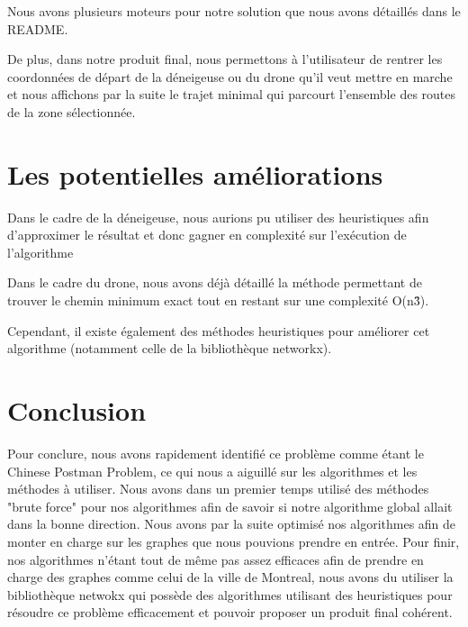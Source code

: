 \documentclass{article}
\begin{document}
\newline

Nous avons plusieurs moteurs pour notre solution que nous avons détaillés dans le README.

\newline

De plus, dans notre produit final, nous permettons à l'utilisateur de rentrer les coordonnées de départ de la déneigeuse ou du drone qu'il veut mettre en marche et nous affichons par la suite le trajet minimal qui parcourt l'ensemble des routes de la zone sélectionnée. 



\vspace{1cm}

\section{Les potentielles améliorations}

Dans le cadre de la déneigeuse, nous aurions pu utiliser des heuristiques afin d'approximer le résultat et donc gagner en complexité sur l'exécution de l'algorithme

Dans le cadre du drone, nous avons déjà détaillé la méthode permettant de trouver le chemin minimum exact tout en restant sur une complexité O(n\^3).

\newline

Cependant, il existe également des méthodes heuristiques pour améliorer cet algorithme (notamment celle de la bibliothèque networkx).



\newpage

\section{Conclusion}

Pour conclure, nous avons rapidement identifié ce problème comme étant le Chinese Postman Problem, ce qui nous a aiguillé sur les algorithmes et les méthodes à utiliser. Nous avons dans un premier temps utilisé des méthodes "brute force" pour nos algorithmes afin de savoir si notre algorithme global allait dans la bonne direction. Nous avons par la suite optimisé nos algorithmes afin de monter en charge sur les graphes que nous pouvions prendre en entrée. Pour finir, nos algorithmes n'étant tout de même pas assez efficaces afin de prendre en charge des graphes comme celui de la ville de Montreal, nous avons du utiliser la bibliothèque netwokx qui possède des algorithmes utilisant des heuristiques pour résoudre ce problème efficacement et pouvoir proposer un produit final cohérent.
\end{document}
